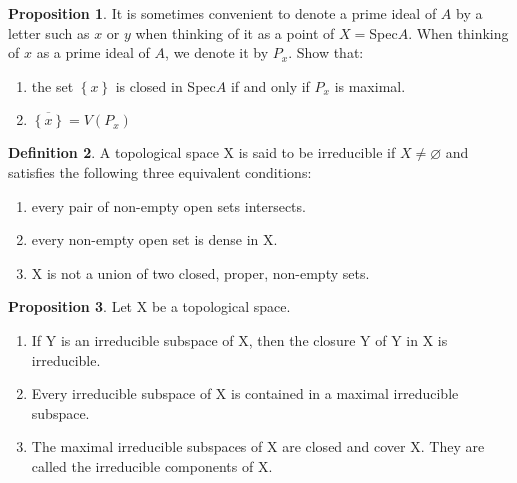 \documentclass[a4paper,12pt]{article}
\newcommand{\bbrace}[1]{\left\{ #1 \right\} }
\theoremstyle{definition}
\newtheorem{defn}{Definition}[subsection]
\newtheorem{prop}[defn]{Proposition}
\begin{document}
\begin{prop}
    It is sometimes convenient to denote a prime ideal
    of $A$ by a letter such as $x$ or $y$ when thinking of it as a point of $X=$Spec$A$.
    When thinking of $x$ as a prime ideal of $A$, we denote it by $P_x$. Show that:
    \begin{enumerate}[(1)]
        \item the set $\bbrace{x}$ is closed in Spec$A$ if and only if $P_x$ is maximal.
        \item $\overline{\bbrace{x}}=V(P_x)$
    \end{enumerate}
\end{prop}
\begin{defn}
    A topological space X is said to be irreducible if $X\neq \varnothing$ and satisfies the following three equivalent conditions:
    \begin{enumerate}[(1)]
        \item every pair of non-empty open sets intersects.
        \item every non-empty open set is dense in X.
        \item X is not a union of two closed, proper, non-empty sets.
    \end{enumerate}
\end{defn}
\begin{prop}
    Let X be a topological space.
    \begin{enumerate}[(1)]
        \item If Y is an irreducible subspace of X, then the closure Y of Y
              in X is irreducible.
        \item Every irreducible subspace of X is contained in a maximal irreducible
              subspace.
        \item The maximal irreducible subspaces of X are closed and cover X. They are
              called the irreducible components of X.
    \end{enumerate}
\end{prop}
\end{document}
